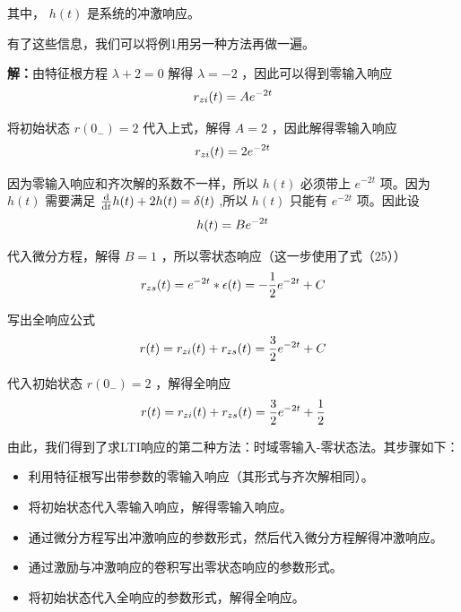 \documentclass[UTF8,a4paper,11pt]{article}
\begin{document}
其中， $h(t)$ 是系统的冲激响应。

有了这些信息，我们可以将例1用另一种方法再做一遍。

\textbf{解：}由特征根方程 $\lambda +2=0$ 解得 $\lambda =-2$ ，因此可以得到零输入响应
\begin{equation}
r_{zi}(t)=Ae^{-2t}
\notag
\end{equation}

将初始状态 $r(0_{-})=2$ 代入上式，解得 $A=2$ ，因此解得零输入响应
\begin{equation}
r_{zi}(t)=2e^{-2t}
\notag
\end{equation}

因为零输入响应和齐次解的系数不一样，所以 $h(t)$ 必须带上 $e^{-2t}$ 项。因为 $h(t)$ 需要满足 $\frac{{\rm d}}{{\rm d}t}h(t)+2h(t)=\delta(t)$ ,所以 $h(t)$ 只能有 $e^{-2t}$ 项。因此设
\begin{equation}
h(t)=Be^{-2t}
\notag
\end{equation}

代入微分方程，解得 $B=1$ ，所以零状态响应（这一步使用了式（25））
\begin{equation}
r_{zs}(t)=e^{-2t}*\epsilon(t)=-\frac{1}{2}e^{-2t}+C
\notag
\end{equation}

写出全响应公式
\begin{equation}
r(t)=r_{zi}(t)+r_{zs}(t)=\frac{3}{2}e^{-2t}+C
\notag
\end{equation}

代入初始状态 $r(0_{-})=2$ ，解得全响应
\begin{equation}
r(t)=r_{zi}(t)+r_{zs}(t)=\frac{3}{2}e^{-2t}+\frac{1}{2}
\notag
\end{equation}

由此，我们得到了求LTI响应的第二种方法：时域零输入-零状态法。其步骤如下：
\begin{itemize}
\item 利用特征根写出带参数的零输入响应（其形式与齐次解相同）。
\item 将初始状态代入零输入响应，解得零输入响应。
\item 通过微分方程写出冲激响应的参数形式，然后代入微分方程解得冲激响应。
\item 通过激励与冲激响应的卷积写出零状态响应的参数形式。
\item 将初始状态代入全响应的参数形式，解得全响应。
\end{itemize} 
\end{document}
